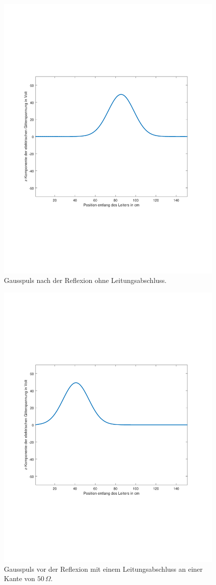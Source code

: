 \documentclass[Protokollheft.tex]{subfiles}
\begin{document}
\begin{figure}[ht]
	\centering
	\includegraphics[trim = 20mm 65mm 20mm 65mm, clip,width=0.7\linewidth]{untitled2.pdf}
	\caption{Gausspuls nach der Reflexion ohne Leitungsabschluss.}\label{fig:gauss2}
\end{figure}
\begin{figure}[ht]
	\centering
	\includegraphics[trim = 20mm 65mm 20mm 65mm, clip,width=0.7\linewidth]{untitled3.pdf}
	\caption{Gausspuls vor der Reflexion mit einem Leitungsabschluss an einer Kante von $50\,\Omega$.}\label{fig:gauss3}
\end{figure}
\end{document}
